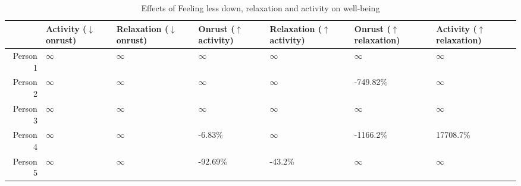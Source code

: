 \begin{table*}[ht]
\centering
\begin{tabular}{rllllll}
  \toprule
 & Activity ($\downarrow$ onrust) & Relaxation ($\downarrow$ onrust) & Onrust ($\uparrow$ activity) & Relaxation ($\uparrow$ activity) & Onrust ($\uparrow$ relaxation) & Activity ($\uparrow$ relaxation) \\ 
  \midrule
Person 1 & $\infty$ & $\infty$ & $\infty$ & $\infty$ & $\infty$ & $\infty$ \\ 
  Person 2 & $\infty$ & $\infty$ & $\infty$ & $\infty$ & -749.82\% & $\infty$ \\ 
  Person 3 & $\infty$ & $\infty$ & $\infty$ & $\infty$ & $\infty$ & $\infty$ \\ 
  Person 4 & $\infty$ & $\infty$ & -6.83\% & $\infty$ & -1166.2\% & 17708.7\% \\ 
  Person 5 & $\infty$ & $\infty$ & -92.69\% & -43.2\% & $\infty$ & $\infty$ \\ 
   \bottomrule
\end{tabular}
\caption{Effects of Feeling less down, relaxation and activity on well-being} 
\label{tab:effects_in_aira}
\end{table*}
